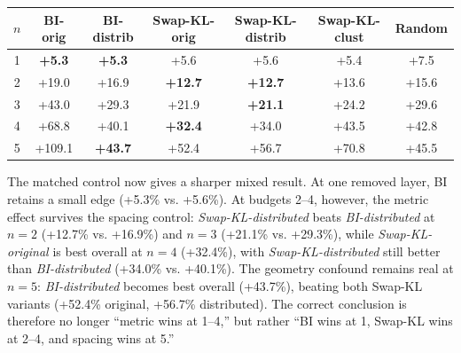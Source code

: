 \documentclass{article}
\newenvironment{tabhere}{%
  \par\medskip
  \begin{center}
}{%
  \end{center}
  \medskip
}
\begin{document}
\begin{tabhere}
\begin{tabular}{ccccccc}
\toprule
$n$ & BI-orig & BI-distrib & Swap-KL-orig & \textbf{Swap-KL-distrib} & Swap-KL-clust & Random \\
\midrule
1 & \textbf{+5.3} & \textbf{+5.3} & +5.6 & +5.6 & +5.4 & +7.5 \\
2 & +19.0 & +16.9 & \textbf{+12.7} & \textbf{+12.7} & +13.6 & +15.6 \\
3 & +43.0 & +29.3 & +21.9 & \textbf{+21.1} & +24.2 & +29.6 \\
4 & +68.8 & +40.1 & \textbf{+32.4} & +34.0 & +43.5 & +42.8 \\
5 & +109.1 & \textbf{+43.7} & +52.4 & +56.7 & +70.8 & +45.5 \\
\bottomrule
\end{tabular}
\label{tab:geometry_ablation}
\end{tabhere}


The matched control now gives a sharper mixed result. At one removed layer, BI retains a small edge (+5.3\% vs. +5.6\%). At budgets 2--4, however, the metric effect survives the spacing control: \emph{Swap-KL-distributed} beats \emph{BI-distributed} at $n{=}2$ (+12.7\% vs. +16.9\%) and $n{=}3$ (+21.1\% vs. +29.3\%), while \emph{Swap-KL-original} is best overall at $n{=}4$ (+32.4\%), with \emph{Swap-KL-distributed} still better than \emph{BI-distributed} (+34.0\% vs. +40.1\%). The geometry confound remains real at $n{=}5$: \emph{BI-distributed} becomes best overall (+43.7\%), beating both Swap-KL variants (+52.4\% original, +56.7\% distributed). The correct conclusion is therefore no longer ``metric wins at 1--4,'' but rather ``BI wins at 1, Swap-KL wins at 2--4, and spacing wins at 5.''
\end{document}
